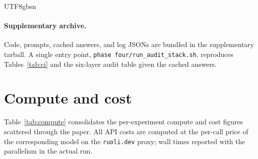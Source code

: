 \documentclass{article}
\begin{document}
\begin{CJK*}{UTF8}{gbsn}
\paragraph{Supplementary archive.} Code, prompts, cached answers,
and log JSONs are bundled in the supplementary tarball. A single
entry point, \texttt{phase four/run\_audit\_stack.sh}, reproduces
Tables~\ref{tab:ci} and the six-layer audit table given the cached
answers.

\section{Compute and cost}
\label{app:compute}

Table~\ref{tab:compute} consolidates the per-experiment compute and
cost figures scattered through the paper. All API costs are computed
at the per-call price of the corresponding model on the
\texttt{ruoli.dev} proxy; wall times reported with the parallelism
in the actual run.


\end{CJK*}
\end{document}
